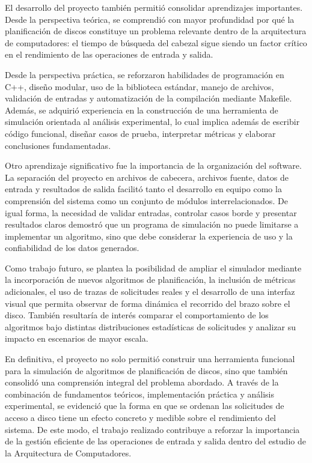 \documentclass[14pt,letterpaper]{extarticle}
\begin{document}
El desarrollo del proyecto también permitió consolidar aprendizajes importantes. Desde la perspectiva teórica, se comprendió con mayor profundidad por qué la planificación de discos constituye un problema relevante dentro de la arquitectura de computadores: el tiempo de búsqueda del cabezal sigue siendo un factor crítico en el rendimiento de las operaciones de entrada y salida.

Desde la perspectiva práctica, se reforzaron habilidades de programación en C++, diseño modular, uso de la biblioteca estándar, manejo de archivos, validación de entradas y automatización de la compilación mediante Makefile. Además, se adquirió experiencia en la construcción de una herramienta de simulación orientada al análisis experimental, lo cual implica además de escribir código funcional, diseñar casos de prueba, interpretar métricas y elaborar conclusiones fundamentadas.

Otro aprendizaje significativo fue la importancia de la organización del software. La separación del proyecto en archivos de cabecera, archivos fuente, datos de entrada y resultados de salida facilitó tanto el desarrollo en equipo como la comprensión del sistema como un conjunto de módulos interrelacionados. De igual forma, la necesidad de validar entradas, controlar casos borde y presentar resultados claros demostró que un programa de simulación no puede limitarse a implementar un algoritmo, sino que debe considerar la experiencia de uso y la confiabilidad de los datos generados.

Como trabajo futuro, se plantea la posibilidad de ampliar el simulador mediante la incorporación de nuevos algoritmos de planificación, la inclusión de métricas adicionales, el uso de trazas de solicitudes reales y el desarrollo de una interfaz visual que permita observar de forma dinámica el recorrido del brazo sobre el disco. También resultaría de interés comparar el comportamiento de los algoritmos bajo distintas distribuciones estadísticas de solicitudes y analizar su impacto en escenarios de mayor escala.

En definitiva, el proyecto no solo permitió construir una herramienta funcional para la simulación de algoritmos de planificación de discos, sino que también consolidó una comprensión integral del problema abordado. A través de la combinación de fundamentos teóricos, implementación práctica y análisis experimental, se evidenció que la forma en que se ordenan las solicitudes de acceso a disco tiene un efecto concreto y medible sobre el rendimiento del sistema. De este modo, el trabajo realizado contribuye a reforzar la importancia de la gestión eficiente de las operaciones de entrada y salida dentro del estudio de la Arquitectura de Computadores.
\end{document}
